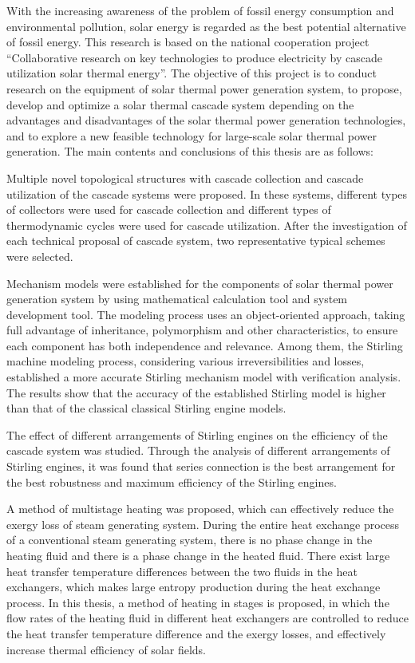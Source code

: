 \enabstract
{
With the increasing awareness of the problem of fossil energy consumption and environmental pollution, solar energy is regarded as the best potential alternative of fossil energy. This research is based on the national cooperation project ``Collaborative research on key technologies to produce electricity by cascade utilization solar thermal energy''. The objective of this project is to conduct research on the equipment of solar thermal power generation system, to propose, develop and optimize a solar thermal cascade system depending on the advantages and disadvantages of the solar thermal power generation technologies, and to explore a new feasible technology for large-scale solar thermal power generation. The main contents and conclusions of this thesis are as follows:

Multiple novel topological structures with cascade collection and cascade utilization of the cascade systems were proposed. In these systems, different types of collectors were used for cascade collection and different types of thermodynamic cycles were used for cascade utilization. After the investigation of each technical proposal of cascade system, two representative typical schemes were selected.

Mechanism models were established for the components of solar thermal power generation system by using mathematical calculation tool and system development tool. The modeling process uses an object-oriented approach, taking full advantage of inheritance, polymorphism and other characteristics, to ensure each component has both independence and relevance. Among them, the Stirling machine modeling process, considering various irreversibilities and losses, established a more accurate Stirling mechanism model with verification analysis. The results show that the accuracy of the established Stirling model is higher than that of the classical classical Stirling engine models.

The effect of different arrangements of Stirling engines on the efficiency of the cascade system was studied. Through the analysis of different arrangements of Stirling engines, it was found that series connection is the best arrangement for the best robustness and maximum efficiency of the Stirling engines.

A method of multistage heating was proposed, which can effectively reduce the exergy loss of steam generating system. During the entire heat exchange process of a conventional steam generating system, there is no phase change in the heating fluid and there is a phase change in the heated fluid. There exist large heat transfer temperature differences between the two fluids in the heat exchangers, which makes large entropy production during the heat exchange process. In this thesis, a method of heating in stages is proposed, in which the flow rates of the heating fluid in different heat exchangers are controlled to reduce the heat transfer temperature difference and the exergy losses, and effectively increase thermal efficiency of solar fields.

}
